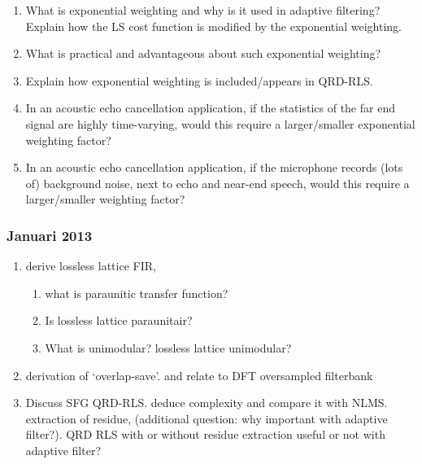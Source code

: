 \documentclass[
  a4paper,
  ,captions=tableheading
]{scrartcl}
\providecommand{\tightlist}{%
  \setlength{\itemsep}{0pt}\setlength{\parskip}{0pt}}
\begin{document}
\begin{enumerate}
  \begin{enumerate}
  \def\labelenumii{\arabic{enumii}.}
  \tightlist
  \item
    What is exponential weighting and why is it used in adaptive
    filtering? Explain how the LS cost function is modified by the
    exponential weighting.\\
  \item
    What is practical and advantageous about such exponential
    weighting?\\
  \item
    Explain how exponential weighting is included/appears in QRD-RLS.\\
  \item
    In an acoustic echo cancellation application, if the statistics of
    the far end signal are highly time-varying, would this require a
    larger/smaller exponential weighting factor?\\
  \item
    In an acoustic echo cancellation application, if the microphone
    records (lots of) background noise, next to echo and near-end
    speech, would this require a larger/smaller weighting factor?
  \end{enumerate}
\end{enumerate}

\subsubsection{\texorpdfstring{\textbf{Januari
2013}}{Januari 2013}}\label{januari-2013-1}

\begin{enumerate}
\def\labelenumi{\arabic{enumi}.}
\tightlist
\item
  derive lossless lattice FIR,

  \begin{enumerate}
  \def\labelenumii{\arabic{enumii}.}
  \tightlist
  \item
    what is paraunitic transfer function?\\
  \item
    Is lossless lattice paraunitair?\\
  \item
    What is unimodular? lossless lattice unimodular?\\
  \end{enumerate}
\item
  derivation of `overlap-save'. and relate to DFT oversampled
  filterbank\\
\item
  Discuss SFG QRD-RLS. deduce complexity and compare it with NLMS.
  extraction of residue, (additional question: why important with
  adaptive filter?). QRD RLS with or without residue extraction useful
  or not with adaptive filter?
\end{enumerate}
\end{document}
